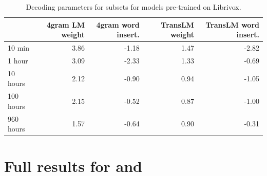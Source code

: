 \documentclass{article}
\begin{document}
\begin{table}[ht!]
\caption{%
Decoding parameters for \libri{} subsets for models pre-trained on Librivox.
}
\label{tbl:decoding-params-vox}
\centering 
\begin{tabular}{lrrrr}
\toprule
{} & 4gram LM weight & 4gram word insert. & TransLM weight & TransLM word insert. \\
\midrule
10 min & 3.86 & -1.18 & 1.47 & -2.82 \\
1 hour & 3.09 & -2.33 & 1.33 & -0.69 \\
10 hours & 2.12 & -0.90  & 0.94 & -1.05 \\
100 hours & 2.15 & -0.52 & 0.87 & -1.00 \\
960 hours & 1.57 & -0.64 & 0.90 & -0.31 \\
\bottomrule
\end{tabular}
\end{table}


\newpage
\section{Full results for \libril{} and \libri{}}
\label{app:libri}
\end{document}
